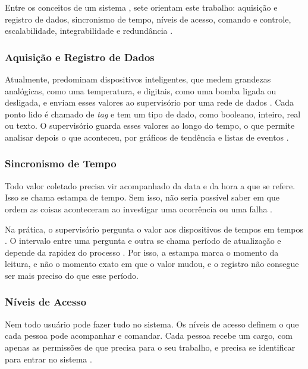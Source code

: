 \par Entre os conceitos de um sistema , sete orientam este trabalho: aquisição e registro de dados, sincronismo de tempo, níveis de acesso, comando e controle, escalabilidade, integrabilidade e redundância \cite{ZANGHI2019_SCADA_CONCEITOS}.

\subsubsection{Aquisição e Registro de Dados}

\par Atualmente, predominam dispositivos inteligentes, que medem grandezas analógicas, como uma temperatura, e digitais, como uma bomba ligada ou desligada, e enviam esses valores ao supervisório por uma rede de dados \cite{YADAV2020_SCADA_ARCHITECTURE_REVIEW}. Cada ponto lido é chamado de \emph{tag} e tem um tipo de dado, como booleano, inteiro, real ou texto. O supervisório guarda esses valores ao longo do tempo, o que permite analisar depois o que aconteceu, por gráficos de tendência e listas de eventos \cite{ZANGHI2019_SCADA_CONCEITOS}.

\subsubsection{Sincronismo de Tempo}

\par Todo valor coletado precisa vir acompanhado da data e da hora a que se refere. Isso se chama estampa de tempo. Sem isso, não seria possível saber em que ordem as coisas aconteceram ao investigar uma ocorrência ou uma falha \cite{ZANGHI2019_SCADA_CONCEITOS}.

\par Na prática, o supervisório pergunta o valor aos dispositivos de tempos em tempos \cite{STOUFFER2015_NIST_ICS_SECURITY}. O intervalo entre uma pergunta e outra se chama período de atualização e depende da rapidez do processo \cite{YADAV2020_SCADA_ARCHITECTURE_REVIEW}. Por isso, a estampa marca o momento da leitura, e não o momento exato em que o valor mudou, e o registro não consegue ser mais preciso do que esse período.

\subsubsection{Níveis de Acesso}

\par Nem todo usuário pode fazer tudo no sistema. Os níveis de acesso definem o que cada pessoa pode acompanhar e comandar. Cada pessoa recebe um cargo, com apenas as permissões de que precisa para o seu trabalho, e precisa se identificar para entrar no sistema \cite{STOUFFER2015_NIST_ICS_SECURITY}.

